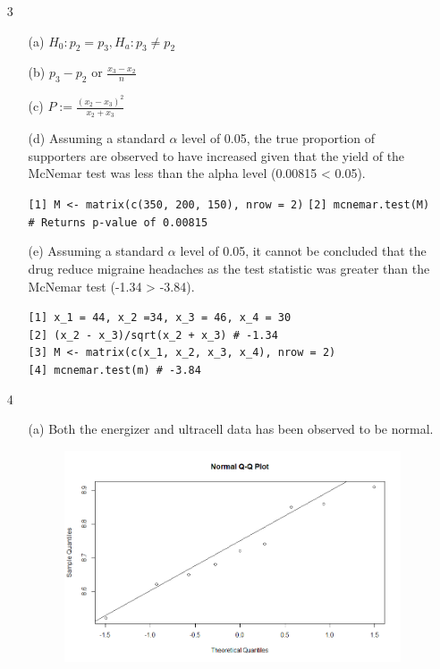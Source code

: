 \documentclass[12pt]{article}
\begin{document}
\begin{enumerate}
\begin{enumerate}
		\end{enumerate}
	\item[3]
		\begin{enumerate}
			\item[(a)] $H_0: p_2 = p_3, H_a: p_3 \neq p_2$
			\item[(b)] $p_3 - p_2$ or $\frac{x_3 - x_2}{n}$
			\item[(c)] $P := \frac{(x_2 - x_3)^2}{x_2 + x_3}$
			\item[(d)] Assuming a standard $\alpha$ level of 0.05, the true proportion of supporters are observed to have 
				increased given that the yield of the McNemar test was less than the alpha level (0.00815 < 0.05).
				\begin{tcolorbox}[colback=white]
					\texttt{[1] M <- matrix(c(350, 200, 150), nrow = 2)}
					\texttt{[2] mcnemar.test(M) \# Returns p-value of 0.00815}
				\end{tcolorbox}
			\item[(e)] Assuming a standard $\alpha$ level of 0.05, it cannot be concluded that the drug reduce migraine headaches as the 
				test statistic was greater than the McNemar test (-1.34 > -3.84).
				\begin{tcolorbox}[colback=white]
					\texttt{[1] x\_1 = 44, x\_2 =34, x\_3 = 46, x\_4 = 30}\\
					\texttt{[2] (x\_2 - x\_3)/sqrt(x\_2 + x\_3) \# -1.34}\\
					\texttt{[3] M <- matrix(c(x\_1, x\_2, x\_3, x\_4), nrow = 2)}\\
					\texttt{[4] mcnemar.test(m) \# -3.84}
				\end{tcolorbox}
		\end{enumerate}
	\item[4]
		\begin{enumerate}
			\item[(a)] Both the energizer and ultracell data has been 
				observed to be normal.
				\begin{figure}[!h]
					\includegraphics[width=\linewidth]{4a1.jpg}

\end{figure}
\end{enumerate}
\end{enumerate}
\end{document}
